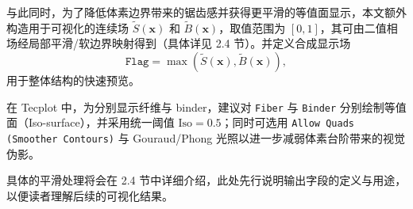 与此同时，为了降低体素边界带来的锯齿感并获得更平滑的等值面显示，本文额外构造用于可视化的连续场 $\tilde{S}(\textbf{x})$ 和 $\tilde{B}(\textbf{x})$，取值范围为 $[0,1]$，其可由二值相场经局部平滑/软边界映射得到（具体详见 2.4 节）。并定义合成显示场
\begin{equation}
\texttt{Flag}=\max(\tilde{S}(\textbf{x}),\tilde{B}(\textbf{x})),
\end{equation}
用于整体结构的快速预览。

在 Tecplot 中，为分别显示纤维与 binder，建议对 \texttt{Fiber} 与 \texttt{Binder} 分别绘制等值面（Iso-surface），并采用统一阈值 $\mathrm{Iso}=0.5$；同时可选用 \texttt{Allow Quads (Smoother Contours)} 与 Gouraud/Phong 光照以进一步减弱体素台阶带来的视觉伪影。

具体的平滑处理将会在 2.4 节中详细介绍，此处先行说明输出字段的定义与用途，以便读者理解后续的可视化结果。